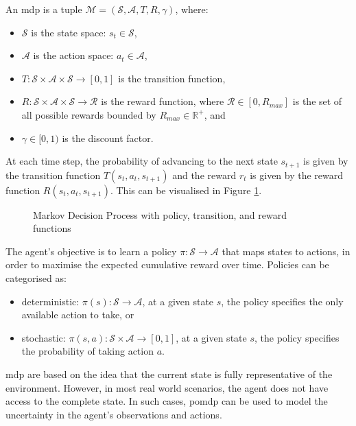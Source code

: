 \begin{definition}
    An \acrshort{mdp} is a tuple $\mathcal{M} = \left(\mathcal{S}, \mathcal{A}, T, R, \gamma\right)$, where:
    \begin{itemize}
        \item $\mathcal{S}$ is the state space: $s_t \in \mathcal{S}$,
        \item $\mathcal{A}$ is the action space: $a_t \in \mathcal{A}$,
        \item $T: \mathcal{S} \times \mathcal{A} \times \mathcal{S} \rightarrow [0, 1]$ is the transition function,
        \item $R: \mathcal{S} \times \mathcal{A} \times \mathcal{S} \rightarrow \mathcal{R}$ is the reward function, where $\mathcal{R} \in \left[0, R_{max}\right]$ is the set of all possible rewards bounded by $R_{max} \in \mathbb{R}^+$, and
        \item $\gamma \in [0, 1)$ is the discount factor.
    \end{itemize}
    
\end{definition}

At each time step, the probability of advancing to the next state $s_{t+1}$ is given by the transition function $T(s_t, a_t, s_{t+1})$ and the reward $r_t$ is given by the reward function $R(s_t, a_t, s_{t+1})$. This can be visualised in Figure \ref{fig:mdp}.

\begin{figure}[ht]
    \label{fig:mdp}
    \centering
    
    \caption{Markov Decision Process with policy, transition, and reward functions}
\end{figure}

The agent's objective is to learn a policy $\pi: \mathcal{S} \rightarrow \mathcal{A}$ that maps states to actions, in order to maximise the expected cumulative reward over time. Policies can be categorised as:
\begin{itemize}
    \item deterministic: $\pi(s) : \mathcal{S} \to \mathcal{A}$, at a given state $s$, the policy specifies the only available action to take, or
    \item stochastic: $\pi(s, a) : \mathcal{S} \times \mathcal{A} \to [0, 1]$, at a given state $s$, the policy specifies the probability of taking action $a$.
\end{itemize}

\acrlong{mdp} are based on the idea that the current state is fully representative of the environment. However, in most real world scenarios, the agent does not have access to the complete state. In such cases, \acrfull{pomdp} can be used to model the uncertainty in the agent's observations and actions.

